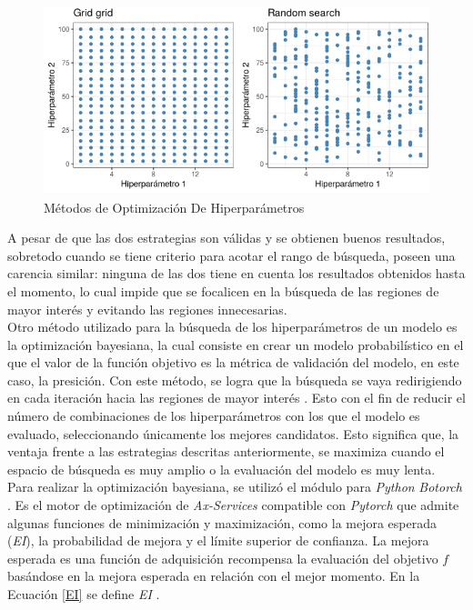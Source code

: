 	\begin{figure}[ht]
		\centering
		\includegraphics[scale=0.6]{Figs/121.png}
		\caption{Métodos de Optimización De Hiperparámetros}
		\label{fig:Hiperparámetros grid search y random search}
	\end{figure}
	
	A pesar de que las dos estrategias son válidas y se obtienen buenos resultados, sobretodo cuando se tiene criterio para acotar el rango de búsqueda, poseen una carencia similar: ninguna de las dos tiene en cuenta los resultados obtenidos hasta el momento, lo cual impide que se focalicen en la búsqueda de las regiones de mayor interés y evitando las regiones innecesarias.\\
	

	Otro método utilizado para la búsqueda de los hiperparámetros de un modelo es la optimización bayesiana, la cual consiste en crear un modelo probabilístico en el que el valor de la función objetivo es la métrica de validación del modelo, en este caso, la presición. Con este método, se logra que la búsqueda se vaya redirigiendo en cada iteración hacia las regiones de mayor interés \cite{frazier2018tutorial}. Esto con el fin de reducir el número de combinaciones de los hiperparámetros con los que el modelo es evaluado, seleccionando únicamente los mejores candidatos. Esto significa que, la ventaja frente a las estrategias descritas anteriormente, se maximiza cuando el espacio de búsqueda es muy amplio o la evaluación del modelo es muy lenta.\\
	
	Para realizar la optimización bayesiana, se utilizó el módulo para \textit{Python} \textit{Botorch}  \cite{balandat2020botorch}. Es el motor de optimización de \textit{Ax-Services} compatible con \textit{Pytorch} que admite algunas funciones de minimización y maximización, como la mejora esperada (\textit{EI}), la probabilidad de mejora y el límite superior de confianza. La mejora esperada es una función de adquisición recompensa la evaluación del objetivo $f$ basándose en la mejora esperada en relación con el mejor momento. En la Ecuación \ref{EI} se define  \textit{EI} .
	
